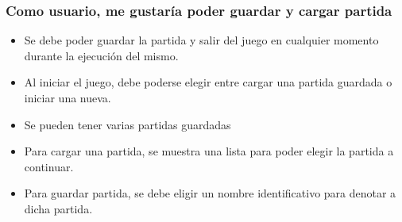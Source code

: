 \documentclass{article}
\begin{document}
\subsubsection*{Como usuario, me gustaría poder guardar y cargar partida}
\begin{itemize}
\item Se debe poder guardar la partida y salir del juego en cualquier momento durante la ejecución del mismo.
\item Al iniciar el juego, debe poderse elegir entre cargar una partida guardada o iniciar una nueva.
\item Se pueden tener varias partidas guardadas
\item Para cargar una partida, se muestra una lista para poder elegir la partida a continuar.
\item Para guardar partida, se debe eligir un nombre identificativo para denotar a dicha partida.
\end{itemize}
\end{document}

